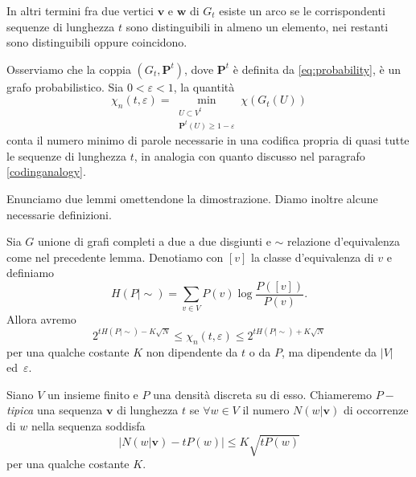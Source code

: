 In altri termini fra due vertici \(\mathbf{v}\) e \(\mathbf{w}\) di \(G_t\) esiste un arco se le corrispondenti sequenze di lunghezza \(t\) sono distinguibili in almeno un elemento, nei restanti sono distinguibili oppure coincidono.

Osserviamo che la coppia \((G_t, \mathbf{P}^t)\), dove \(\mathbf{P}^t\) è definita da \eqref{eq:probability}, è un grafo probabilistico. Sia \(0<\varepsilon <1\), la quantità
\[\chi_{n}(t,\varepsilon) = \min_{\substack{U\subset V^{t}\\\mathbf{P}^t(U)\ge 1-\varepsilon}} \chi(G_{t}(U))\]
conta il numero minimo di parole necessarie in una codifica propria di quasi tutte le sequenze di lunghezza \(t\), in analogia con quanto discusso nel paragrafo \ref{codinganalogy}.

Enunciamo due lemmi omettendone la dimostrazione. Diamo inoltre alcune necessarie definizioni. 
\begin{lemma}
	\label{boundslemma} Sia \(G\) unione di grafi completi a due a due disgiunti e \(\sim\) relazione d'equivalenza come nel precedente lemma. Denotiamo con \([v]\) la classe d'equivalenza di \(v\) e definiamo
	\[H(P\mid \sim)=\sum_{v\in V} P(v)\log{\frac{P([v])}{P(v)}}.\]
	Allora avremo
	\[2^{tH(P\mid \sim)-K\sqrt{N}}\le \chi_{n}(t,\varepsilon)\le 2^{tH(P\mid \sim)+K\sqrt{N}}\]
	per una qualche costante \(K\) non dipendente da \(t\) o da \(P\), ma dipendente da \(|V|\) ed\ \(\varepsilon\). 
\end{lemma}
\begin{definition}
	Siano \(V\) un insieme finito e \(P\) una densità discreta su di esso. Chiameremo \emph{\(P-\)tipica} una sequenza \(\mathbf{v}\) di lunghezza \(t\) se \(\forall w\in V\) il numero \(N(w\vert \mathbf{v})\) di occorrenze di \(w\) nella sequenza soddisfa
	\[\Big| N(w\vert\mathbf{v}) - tP(w)\Big|\le K\sqrt{tP(w)}\]
	per una qualche costante \(K\). 
\end{definition}

